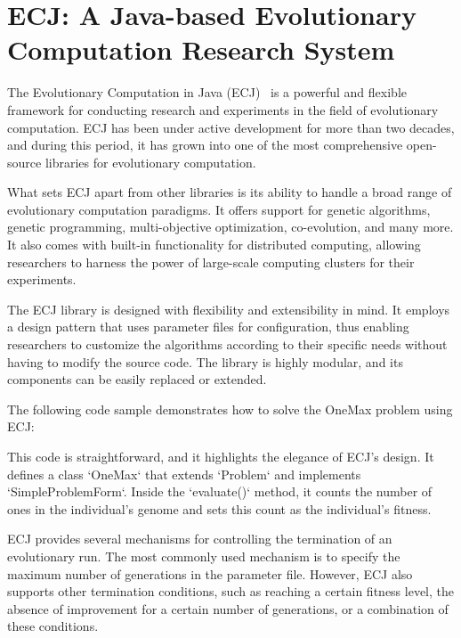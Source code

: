 \section{ECJ: A Java-based Evolutionary Computation Research System}
\label{sec:sota:ecj}

The Evolutionary Computation in Java (ECJ)~\autocite{luke2009ecj} is a powerful and flexible framework for conducting research and experiments in the field of evolutionary computation. ECJ has been under active development for more than two decades, and during this period, it has grown into one of the most comprehensive open-source libraries for evolutionary computation.

What sets ECJ apart from other libraries is its ability to handle a broad range of evolutionary computation paradigms. It offers support for genetic algorithms, genetic programming, multi-objective optimization, co-evolution, and many more. It also comes with built-in functionality for distributed computing, allowing researchers to harness the power of large-scale computing clusters for their experiments.

The ECJ library is designed with flexibility and extensibility in mind. It employs a design pattern that uses parameter files for configuration, thus enabling researchers to customize the algorithms according to their specific needs without having to modify the source code. The library is highly modular, and its components can be easily replaced or extended.

The following code sample demonstrates how to solve the OneMax problem using ECJ:

% 

This code is straightforward, and it highlights the elegance of ECJ's design. It defines a class `OneMax` that extends `Problem` and implements `SimpleProblemForm`. Inside the `evaluate()` method, it counts the number of ones in the individual's genome and sets this count as the individual's fitness.

ECJ provides several mechanisms for controlling the termination of an evolutionary run. The most commonly used mechanism is to specify the maximum number of generations in the parameter file. However, ECJ also supports other termination conditions, such as reaching a certain fitness level, the absence of improvement for a certain number of generations, or a combination of these conditions.

